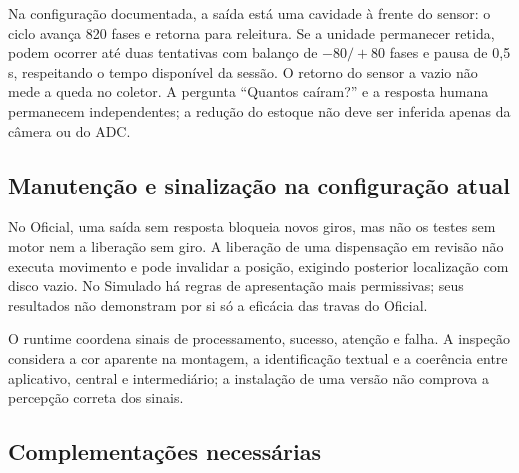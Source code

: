 Na configuração documentada, a saída está uma cavidade à frente do sensor: o ciclo avança 820 fases e retorna para releitura. Se a unidade permanecer retida, podem ocorrer até duas tentativas com balanço de $-80/+80$ fases e pausa de 0,5 s, respeitando o tempo disponível da sessão. O retorno do sensor a vazio não mede a queda no coletor. A pergunta ``Quantos caíram?'' e a resposta humana permanecem independentes; a redução do estoque não deve ser inferida apenas da câmera ou do ADC. 

\subsection{Manutenção e sinalização na configuração atual}
No Oficial, uma saída sem resposta bloqueia novos giros, mas não os testes sem motor nem a liberação sem giro. A liberação de uma dispensação em revisão não executa movimento e pode invalidar a posição, exigindo posterior localização com disco vazio. No Simulado há regras de apresentação mais permissivas; seus resultados não demonstram por si só a eficácia das travas do Oficial. 

O runtime coordena sinais de processamento, sucesso, atenção e falha. A inspeção considera a cor aparente na montagem, a identificação textual e a coerência entre aplicativo, central e intermediário; a instalação de uma versão não comprova a percepção correta dos sinais.

\subsection*{\textcolor{DCPendente}{Complementações necessárias}}
